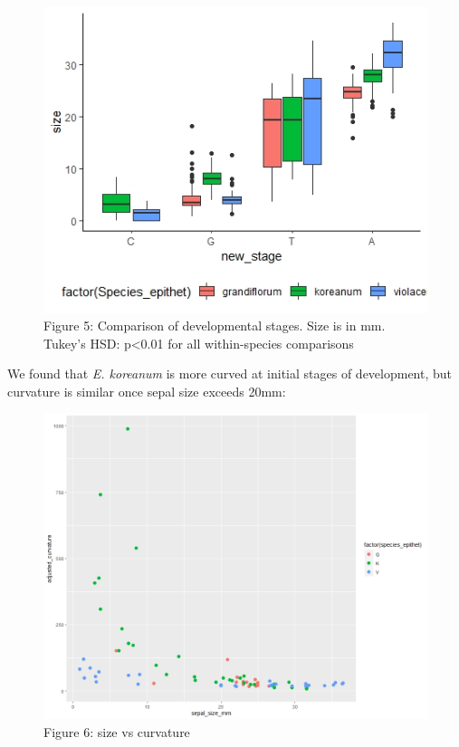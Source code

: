 \documentclass[]{article}
\begin{document}
\begin{figure}
\centering
\includegraphics{Figures/Figure_5.jpeg}
\caption{Figure 5: Comparison of developmental stages. Size is in mm.
Tukey's HSD: p\textless{}0.01 for all within-species comparisons}
\end{figure}

We found that \emph{E. koreanum} is more curved at initial stages of
development, but curvature is similar once sepal size exceeds 20mm:

\begin{figure}
\centering
\includegraphics{Figures/Figure_6.jpeg}
\caption{Figure 6: size vs curvature}
\end{figure}
\end{document}
